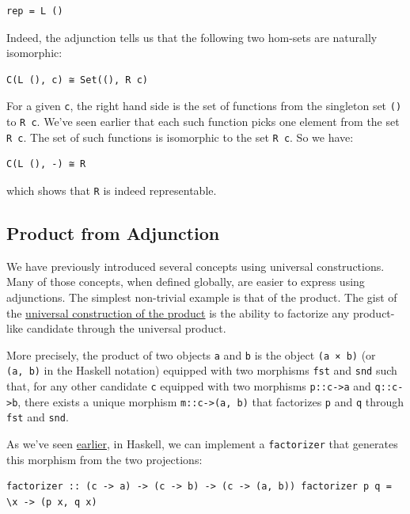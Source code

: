 \begin{verbatim}
rep = L ()
\end{verbatim}

Indeed, the adjunction tells us that the following two hom-sets are
naturally isomorphic:

\begin{verbatim}
C(L (), c) ≅ Set((), R c)
\end{verbatim}

For a given \texttt{c}, the right hand side is the set of functions from
the singleton set \texttt{()} to \texttt{R\ c}. We've seen earlier that
each such function picks one element from the set \texttt{R\ c}. The set
of such functions is isomorphic to the set \texttt{R\ c}. So we have:

\begin{verbatim}
C(L (), -) ≅ R
\end{verbatim}

which shows that \texttt{R} is indeed representable.

\subsection{Product from Adjunction}\label{product-from-adjunction}

We have previously introduced several concepts using universal
constructions. Many of those concepts, when defined globally, are easier
to express using adjunctions. The simplest non-trivial example is that
of the product. The gist of the
\href{https://bartoszmilewski.com/2015/01/07/products-and-coproducts/}{universal
construction of the product} is the ability to factorize any
product-like candidate through the universal product.

More precisely, the product of two objects \texttt{a} and \texttt{b} is
the object \texttt{(a\ ×\ b)} (or \texttt{(a,\ b)} in the Haskell
notation) equipped with two morphisms \texttt{fst} and \texttt{snd} such
that, for any other candidate \texttt{c} equipped with two morphisms
\texttt{p::c-\textgreater{}a} and \texttt{q::c-\textgreater{}b}, there
exists a unique morphism \texttt{m::c-\textgreater{}(a,\ b)} that
factorizes \texttt{p} and \texttt{q} through \texttt{fst} and
\texttt{snd}.

As we've seen
\href{https://bartoszmilewski.com/2015/01/07/products-and-coproducts/}{earlier},
in Haskell, we can implement a \texttt{factorizer} that generates this
morphism from the two projections:

\begin{verbatim}
factorizer :: (c -> a) -> (c -> b) -> (c -> (a, b)) factorizer p q = \x -> (p x, q x)
\end{verbatim}

